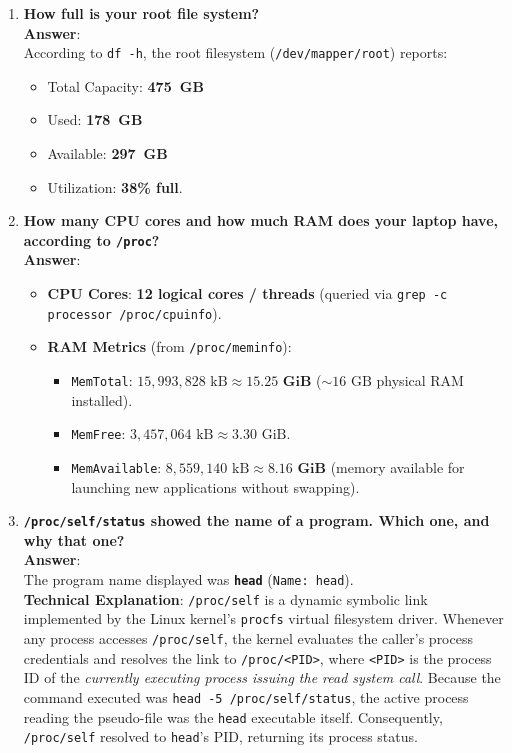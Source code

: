 \documentclass[12pt,a4paper]{article}
\begin{document}
\begin{enumerate}
    \item \textbf{How full is your root file system?} \\
    \textbf{Answer}: \\
    According to \texttt{df -h}, the root filesystem (\texttt{/dev/mapper/root}) reports:
    \begin{itemize}
        \item Total Capacity: \textbf{475~GB}
        \item Used: \textbf{178~GB}
        \item Available: \textbf{297~GB}
        \item Utilization: \textbf{38\% full}.
    \end{itemize}

    \item \textbf{How many CPU cores and how much RAM does your laptop have, according to \texttt{/proc}?} \\
    \textbf{Answer}:
    \begin{itemize}
        \item \textbf{CPU Cores}: \textbf{12 logical cores / threads} (queried via \texttt{grep -c processor /proc/cpuinfo}).
        \item \textbf{RAM Metrics} (from \texttt{/proc/meminfo}):
        \begin{itemize}
            \item \texttt{MemTotal}: $15,993,828\text{ kB} \approx \mathbf{15.25\text{ GiB}}$ ($\sim 16\text{ GB}$ physical RAM installed).
            \item \texttt{MemFree}: $3,457,064\text{ kB} \approx 3.30\text{ GiB}$.
            \item \texttt{MemAvailable}: $8,559,140\text{ kB} \approx \mathbf{8.16\text{ GiB}}$ (memory available for launching new applications without swapping).
        \end{itemize}
    \end{itemize}

    \item \textbf{\texttt{/proc/self/status} showed the name of a program. Which one, and why that one?} \\
    \textbf{Answer}: \\
    The program name displayed was \textbf{\texttt{head}} (\texttt{Name: head}). \\
    \textbf{Technical Explanation}: \texttt{/proc/self} is a dynamic symbolic link implemented by the Linux kernel's \texttt{procfs} virtual filesystem driver. Whenever any process accesses \texttt{/proc/self}, the kernel evaluates the caller's process credentials and resolves the link to \texttt{/proc/<PID>}, where \texttt{<PID>} is the process ID of the \emph{currently executing process issuing the read system call}. Because the command executed was \texttt{head -5 /proc/self/status}, the active process reading the pseudo-file was the \texttt{head} executable itself. Consequently, \texttt{/proc/self} resolved to \texttt{head}'s PID, returning its process status.
\end{enumerate}
\end{document}
